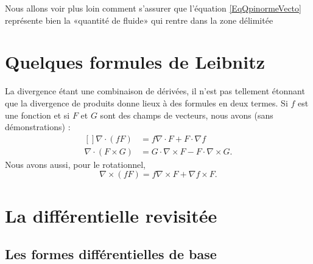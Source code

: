 \begin{remark}
    Nous allons voir plus loin comment s'assurer que l'équation \eqref{EqQpinormeVecto} représente bien la «quantité de fluide» qui rentre dans la zone délimitée
\end{remark}


\section{Quelques formules de Leibnitz}

La divergence étant une combinaison de dérivées, il n'est pas tellement étonnant que la divergence de produits donne lieux à des formules en deux termes. Si $f$ est une fonction et si $F$ et $G$ sont des champs de vecteurs, nous avons (sans démonstrations) :
\begin{equation}        \label{EqLeinDivNablRot}
    \begin{aligned}[]
        \nabla\cdot(fF)&=f\nabla\cdot F+F\cdot\nabla f\\
        \nabla\cdot(F\times G)&=G\cdot\nabla\times F-F\cdot\nabla\times G.
    \end{aligned}
\end{equation}
Nous avons aussi, pour le rotationnel,
\begin{equation}        \label{EqLeinRotfFF}
    \nabla\times(fF)=f\nabla\times F+\nabla f\times F.
\end{equation}

\section{La différentielle revisitée}

\subsection{Les formes différentielles de base}

